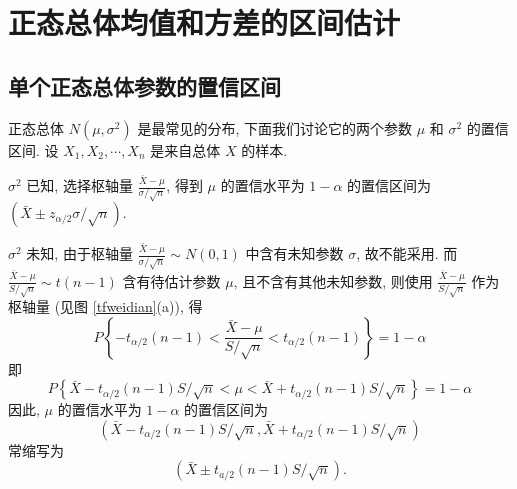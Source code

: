 \section{正态总体均值和方差的区间估计}

\subsection{单个正态总体参数的置信区间}

正态总体 $ N\left(\mu, \sigma^{2}\right) $ 是最常见的分布, 
下面我们讨论它的两个参数 $ \mu $ 和 $ \sigma^{2} $ 的置信区间.
设 $ X_{1}, X_{2}, \cdots, X_{n} $ 是来自总体 $ X $ 的样本.
\begin{theorem}
    $\sigma^{2} $ 已知, 选择枢轴量 $\displaystyle \frac{\bar{X}-\mu}{\sigma / \sqrt{n}}$, 
    得到 $ \mu $ 的置信水平为 $ 1-\alpha $ 的置信区间为 $ \left(\bar{X} \pm z_{\alpha / 2} \sigma / \sqrt{n}\right) .$
\end{theorem}
\begin{theorem}
    $\sigma^{2} $ 未知, 由于枢轴量 $\displaystyle \frac{\bar{X}-\mu}{\sigma / \sqrt{n}} \sim N(0,1) $ 中含有未知参数 $ \sigma $, 
    故不能采用. 而 $\displaystyle \frac{\bar{X}-\mu}{S / \sqrt{n}} \sim t(n-1)$ 含有待估计参数 $ \mu $, 
    且不含有其他未知参数, 则使用 $\displaystyle \frac{\bar{X}-\mu}{S / \sqrt{n}} $ 作为枢轴量 (见图 \ref{tfweidian}(a)), 得
    $$P\left\{-t_{\alpha / 2}(n-1)<\frac{\bar{X}-\mu}{S / \sqrt{n}}<t_{\alpha / 2}(n-1)\right\}=1-\alpha$$
    即
    $$P\left\{\bar{X}-t_{\alpha / 2}(n-1) S / \sqrt{n}<\mu<\bar{X}+t_{\alpha / 2}(n-1) S / \sqrt{n}\right\}=1-\alpha$$
    因此, $\mu $ 的置信水平为 $ 1-\alpha $ 的置信区间为
    $$\left(\bar{X}-t_{\alpha / 2}(n-1) S / \sqrt{n}, \bar{X}+t_{\alpha / 2}(n-1) S / \sqrt{n}\right)$$
    常缩写为 $$\left(\bar{X} \pm t_{a / 2}(n-1) S / \sqrt{n}\right) .$$
\end{theorem}

